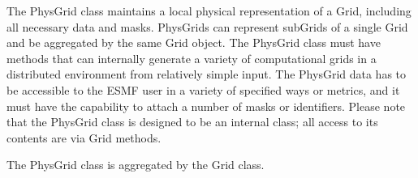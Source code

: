 The PhysGrid class maintains a local physical representation of a Grid,
including all necessary data and masks.  PhysGrids can represent subGrids
of a single Grid and be aggregated by the same Grid object. The PhysGrid
class must have methods that can internally generate a variety of
computational grids in a distributed environment from relatively simple
input.  The PhysGrid data has to be accessible to the ESMF user in a
variety of specified ways or metrics, and it must have the capability to
attach a number of masks or identifiers.  Please note that the PhysGrid class
is designed to be an internal class; all access to its contents are via
Grid methods.


The PhysGrid class is aggregated by the Grid class.
